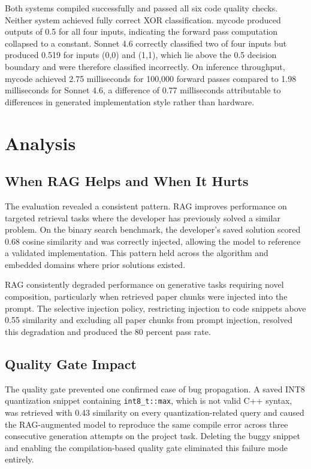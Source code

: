 \documentclass[11pt,twocolumn]{article}
\begin{document}
Both systems compiled successfully and passed all six code quality checks.
Neither system achieved fully correct XOR classification. mycode produced
outputs of 0.5 for all four inputs, indicating the forward pass computation
collapsed to a constant. Sonnet 4.6 correctly classified two of four inputs
but produced 0.519 for inputs (0,0) and (1,1), which lie above the 0.5
decision boundary and were therefore classified incorrectly. On inference
throughput, mycode achieved 2.75 milliseconds for 100,000 forward passes
compared to 1.98 milliseconds for Sonnet 4.6, a difference of 0.77
milliseconds attributable to differences in generated implementation style
rather than hardware.

\section{Analysis}

\subsection{When RAG Helps and When It Hurts}

The evaluation revealed a consistent pattern. RAG improves performance on
targeted retrieval tasks where the developer has previously solved a similar
problem. On the binary search benchmark, the developer's saved solution scored
0.68 cosine similarity and was correctly injected, allowing the model to
reference a validated implementation. This pattern held across the algorithm
and embedded domains where prior solutions existed.

RAG consistently degraded performance on generative tasks requiring novel
composition, particularly when retrieved paper chunks were injected into the
prompt. The selective injection policy, restricting injection to code snippets
above 0.55 similarity and excluding all paper chunks from prompt injection,
resolved this degradation and produced the 80 percent pass rate.

\subsection{Quality Gate Impact}

The quality gate prevented one confirmed case of bug propagation. A saved
INT8 quantization snippet containing \texttt{int8\_t::max}, which is not valid
C++ syntax, was retrieved with 0.43 similarity on every quantization-related
query and caused the RAG-augmented model to reproduce the same compile error
across three consecutive generation attempts on the project task. Deleting the
buggy snippet and enabling the compilation-based quality gate eliminated this
failure mode entirely.
\end{document}
